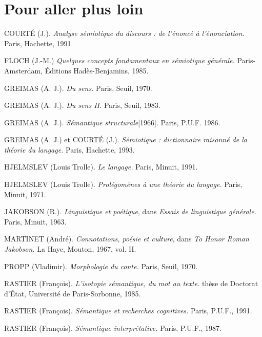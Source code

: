 \section*{Pour aller plus loin}
\begin{flushleft}\small
\setlength{\parskip}{.5em}
COURTÉ (J.). \textit{Analyse sémiotique du discours : de l’énoncé à l’énonciation.} Paris, Hachette, 1991.

FLOCH (J.-M.) \textit{Quelques concepts fondamentaux en sémiotique générale.} Paris-Amsterdam, Éditions Hadès-Benjamins, 1985.

GREIMAS (A. J.). \textit{Du sens.} Paris, Seuil, 1970.

GREIMAS (A. J.). \textit{Du sens II.} Paris, Seuil, 1983.

GREIMAS (A. J.). \textit{Sémantique structurale}[1966]. Paris, P.U.F. 1986.

GREIMAS (A. J.) et COURTÉ (J.). \textit{Sémiotique : dictionnaire raisonné de la théorie du langage.} Paris, Hachette, 1993.

HJELMSLEV (Louis Trolle). \textit{Le langage.} Paris, Minuit, 1991.

HJELMSLEV (Louis Trolle). \textit{Prolégomènes à une théorie du langage.} Paris, Minuit, 1971.

JAKOBSON (R.). \textit{Linguistique et poétique}, dans \textit{Essais de linguistique générale.} Paris, Minuit, 1963.

MARTINET (André). \textit{Connotations, poésie et culture}, dans \textit{To Honor Roman Jakobson.} La Haye, Mouton, 1967, vol. II.

PROPP (Vladimir). \textit{Morphologie du conte.} Paris, Seuil, 1970.

RASTIER (François). \textit{L’isotopie sémantique, du mot au texte.} thèse de Doctorat d’État, Université de Paris-Sorbonne, 1985.

RASTIER (François). \textit{Sémantique et recherches cognitives.} Paris, P.U.F., 1991.

RASTIER (François). \textit{Sémantique interprétative.} Paris, P.U.F., 1987.
\end{flushleft}

